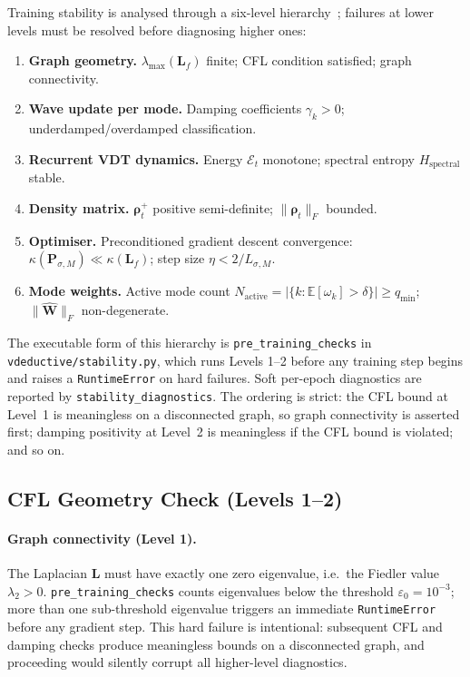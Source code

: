 \documentclass[11pt,a4paper]{article}
\newcommand{\E}[1]{\mathbb{E}\!\left[#1\right]}
\newcommand{\Lmat}{\mathbf{L}}
\newcommand{\Wmat}{\mathbf{W}}
\begin{document}
Training stability is analysed through a six-level hierarchy~\cite{moriondo2026vdeductive};
failures at lower levels must be resolved before diagnosing higher ones:

\begin{enumerate}
  \item \textbf{Graph geometry.}
        $\lambda_{\max}(\Lmat_f)$ finite; CFL condition satisfied;
        graph connectivity.
  \item \textbf{Wave update per mode.}
        Damping coefficients $\gamma_k > 0$; underdamped/overdamped
        classification.
  \item \textbf{Recurrent VDT dynamics.}
        Energy $\mathcal{E}_t$ monotone; spectral entropy $H_{\text{spectral}}$
        stable.
  \item \textbf{Density matrix.}
        $\boldsymbol{\rho}_t^+$ positive semi-definite;
        $\|\boldsymbol{\rho}_t\|_F$ bounded.
  \item \textbf{Optimiser.}
        Preconditioned gradient descent convergence:
        $\kappa(\mathbf{P}_{\sigma,M}) \ll \kappa(\Lmat_f)$;
        step size $\eta < 2/L_{\sigma,M}$.
  \item \textbf{Mode weights.}
        Active mode count $N_{\text{active}} = |\{k:\E{\omega_k}>\delta\}| \geq q_{\min}$;
        $\|\hat{\Wmat}\|_F$ non-degenerate.
\end{enumerate}

The executable form of this hierarchy is \texttt{pre\_training\_checks} in
\texttt{vdeductive/stability.py}, which runs Levels 1--2 before any training step
begins and raises a \texttt{RuntimeError} on hard failures.
Soft per-epoch diagnostics are reported by \texttt{stability\_diagnostics}.
The ordering is strict: the CFL bound at Level~1 is meaningless on a
disconnected graph, so graph connectivity is asserted first; damping
positivity at Level~2 is meaningless if the CFL bound is violated; and so on.


\subsection{CFL Geometry Check (Levels 1--2)}
\label{sec:stability:cfl}

\paragraph{Graph connectivity (Level 1).}
The Laplacian $\Lmat$ must have exactly one zero eigenvalue, i.e.\ the
Fiedler value $\lambda_2 > 0$.  \texttt{pre\_training\_checks} counts
eigenvalues below the threshold $\varepsilon_0 = 10^{-3}$; more than one
sub-threshold eigenvalue triggers an immediate \texttt{RuntimeError} before
any gradient step.  This hard failure is intentional: subsequent CFL and
damping checks produce meaningless bounds on a disconnected graph, and
proceeding would silently corrupt all higher-level diagnostics.
\end{document}
